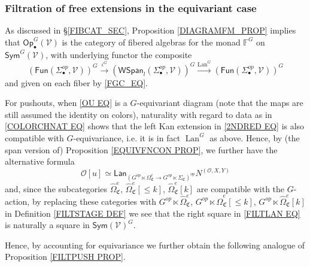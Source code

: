 \documentclass[a4paper,10pt
,draft
]{article}%
\numberwithin{equation}{section}
\numberwithin{figure}{section}
\theoremstyle{definition} %
\newcommand{\Sym}{\ensuremath{\mathsf{Sym}}}%
\newcommand{\Op}{\mathsf{Op}}%
\newcommand{\Fun}{\mathsf{Fun}}
\DeclareMathOperator{\Lan}{Lan}%
\newcommand{\V}{\ensuremath{\mathcal V}}
\renewcommand{\O}{\ensuremath{\mathcal O}}
\newcommand{\1}{\ensuremath{\mathbbm 1}}%
\begin{document}
\subsubsection{Filtration of free extensions in the equivariant case}

As discussed in \S \ref{FIBCAT_SEC},
Proposition \ref{DIAGRAMFM_PROP} implies that $\Op^G_\bullet(\V)$ is the category of fibered algebras for the monad $\mathbb F^G$ on $\Sym^G(\V)$,
with underlying functor the composite
\[
      \left(
            \Fun(\Sigma^{op}_{\bullet}, \mathcal V)
      \right)^G
      \xrightarrow{\iota^G}
      \left(
            \mathsf{WSpan}_l
            (\Sigma^{op}_{\bullet},\mathcal{V})
      \right)^G
      \xrightarrow{\Lan^G}
      \left(
            \mathsf{Fun}
            (\Sigma^{op}_{\bullet},\mathcal{V})
      \right)^G
\]
and given on each fiber by \eqref{FGC_EQ}.
      
For pushouts, when \eqref{OU EQ} is a $G$-equivariant diagram (note that the maps are still assumed the identity on colors),
naturality with regard to data as in \eqref{COLORCHNAT EQ}
shows that the left Kan extension in 
\eqref{2NDRED EQ} 
is also compatible with $G$-equivariance, i.e. it is in fact $\Lan^G$ as above.
Hence, by (the span version of) Proposition \ref{EQUIVFNCON PROP},
we further have the alternative formula
\begin{equation}\label{3RDRED EQ}
\O[u] \simeq
	\mathsf{Lan}_{\left(G^{op} \ltimes \Omega_{\mathfrak C}^{e} \to
	G^{op} \ltimes \Sigma_{\mathfrak C}\right)^{op}} N^{(\O,X,Y)}
\end{equation}
and, since the subcategories 
$\widehat{\Omega}_{\mathfrak{C}}^e$,
$\widehat{\Omega}_{\mathfrak{C}}^e[\leq k]$,
$\widehat{\Omega}_{\mathfrak{C}}^e[k]$
are compatible with the $G$-action, by replacing these categories with 
$G^{op} \ltimes \widehat{\Omega}_{\mathfrak{C}}^e$,
$G^{op} \ltimes \widehat{\Omega}_{\mathfrak{C}}^e[\leq k]$,
$G^{op} \ltimes \widehat{\Omega}_{\mathfrak{C}}^e[k]$
in Definition \ref{FILTSTAGE DEF}
we see that the right square in \eqref{FILTLAN EQ}
is naturally a square in 
$\mathsf{Sym}(\mathcal{V})^G$.

Hence, by accounting for equivariance
we further obtain the following analogue of 
Proposition \ref{FILTPUSH PROP}.
\end{document}
